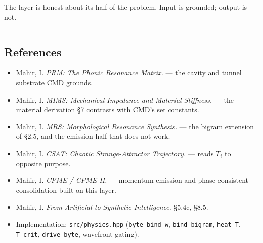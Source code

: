 \documentclass[
  11pt,
  a4paper,
]{article}
\providecommand{\tightlist}{%
  \setlength{\itemsep}{0pt}\setlength{\parskip}{0pt}}
\begin{document}
The layer is honest about its half of the problem. Input is grounded;
output is not.

\begin{center}\rule{0.5\linewidth}{0.5pt}\end{center}

\subsection{References}\label{references}

\begin{itemize}
\tightlist
\item
  Mahir, I. \emph{PRM: The Phonic Resonance Matrix.} --- the cavity and
  tunnel substrate CMD grounds.
\item
  Mahir, I. \emph{MIMS: Mechanical Impedance and Material Stiffness.}
  --- the material derivation §7 contrasts with CMD's set constants.
\item
  Mahir, I. \emph{MRS: Morphological Resonance Synthesis.} --- the
  bigram extension of §2.5, and the emission half that does not work.
\item
  Mahir, I. \emph{CSAT: Chaotic Strange-Attractor Trajectory.} --- reads
  \(T_i\) to opposite purpose.
\item
  Mahir, I. \emph{CPME / CPME-II.} --- momentum emission and
  phase-consistent consolidation built on this layer.
\item
  Mahir, I. \emph{From Artificial to Synthetic Intelligence.} §5.4c,
  §8.5.
\item
  Implementation: \texttt{src/physics.hpp} (\texttt{byte\_bind\_w},
  \texttt{bind\_bigram}, \texttt{heat\_T}, \texttt{T\_crit},
  \texttt{drive\_byte}, wavefront gating).
\end{itemize}
\end{document}
